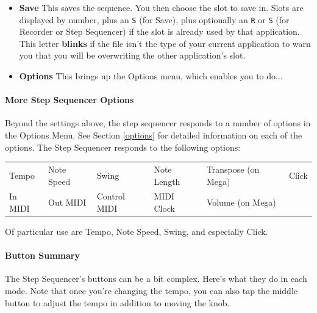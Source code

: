 \documentclass{article}
\begin{document}
\begin{itemize}
\item {\bf Save} \quad This saves the sequence. You then choose the slot to save in.  Slots are displayed by number, plus an \texttt{S} (for Save), plus optionally an \texttt{R} or \texttt{S} (for Recorder or Step Sequencer) if the slot is already used by that application.  This letter {\bf blinks} if the file isn't the type of your current application to warn you that you will be overwriting the other application's slot.

\item {\bf Options} \quad This brings up the Options menu, which enables you to do...
\end{itemize}

\paragraph{More Step Sequencer Options}

Beyond the settings above, the step sequencer responds to a number of options in the Options Menu.  See Section \ref{options} for detailed information on each of the options.  The Step Sequencer responds to the following options:


\vspace{1em}
\begin{tabular}{llllll}
Tempo& Note Speed& Swing & Note Length&Transpose (on Mega)&Click\\
In MIDI& Out MIDI&Control MIDI&MIDI Clock&Volume (on Mega)\\
\end{tabular}

\vspace{1em}
Of particular use are Tempo, Note Speed, Swing, and especially Click.



\paragraph{Button Summary}  The Step Sequencer's buttons can be a bit complex.  Here's what they do in each mode.  Note that once you're changing the tempo, you can also tap the middle button to adjust the tempo in addition to moving the knob.
\end{document}
